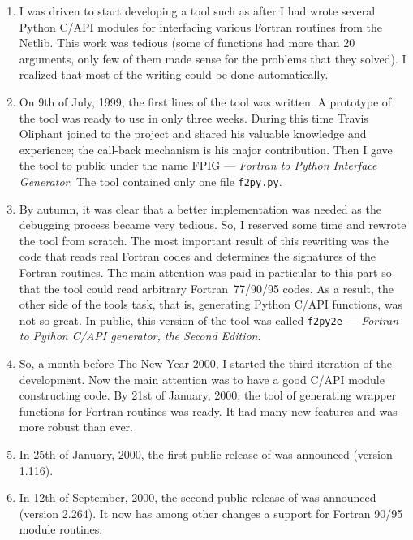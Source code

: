 \begin{enumerate}
\item I was driven to start developing a tool such as \fpy after I had
  wrote several Python C/API modules for interfacing various Fortran
  routines from the Netlib. This work was tedious (some of functions
  had more than 20 arguments, only few of them made sense for the
  problems that they solved). I realized that most of the writing
  could be done automatically.
\item On 9th of July, 1999, the first lines of the tool was written. A
  prototype of the tool was ready to use in only three weeks. During
  this time Travis Oliphant joined to the project and shared his
  valuable knowledge and experience; the call-back mechanism is his
  major contribution.  Then I gave the tool to public under the name
  FPIG --- \emph{Fortran to Python Interface Generator}. The tool contained
  only one file \texttt{f2py.py}.
\item By autumn, it was clear that a better implementation was needed
  as the debugging process became very tedious. So, I reserved some
  time and rewrote the tool from scratch. The most important result of
  this rewriting was the code that reads real Fortran codes and
  determines the signatures of the Fortran routines. The main
  attention was paid in particular to this part so that the tool
  could read arbitrary Fortran~77/90/95 codes. As a result, the other
  side of the tools task, that is, generating Python C/API functions,
  was not so great. In public, this version of the tool was called
  \texttt{f2py2e} --- \emph{Fortran to Python C/API generator, the
    Second Edition}.
\item So, a month before The New Year 2000, I started the third
  iteration of the \fpy development. Now the main attention was to
  have a good C/API module constructing code. By 21st of January,
  2000, the tool of generating wrapper functions for Fortran routines
  was ready. It had many new features and was more robust than ever.
\item In 25th of January, 2000, the first public release of \fpy was
  announced (version 1.116).
\item In 12th of September, 2000, the second public release of \fpy was
  announced (version 2.264). It now has among other changes a support
  for Fortran 90/95 module routines.
\end{enumerate}

